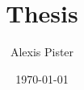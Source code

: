 \documentclass[11pt]{book}
\begin{document}
\title{Thesis}
\author{Alexis Pister}
\date{\today}
\maketitle
\tableofcontents
    
    

    
    
\end{document}
